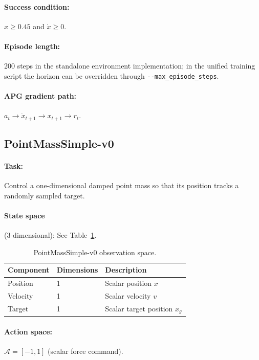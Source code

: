 \documentclass[11pt,a4paper]{article}
\newcommand{\cA}{\mathcal{A}}
\begin{document}
\paragraph{Success condition:} $x \ge 0.45$ and $\dot{x} \ge 0$.

\paragraph{Episode length:} 200 steps in the standalone environment implementation; in the unified training script the horizon can be overridden through \texttt{-{}-max\_episode\_steps}.

\paragraph{APG gradient path:} $a_t \rightarrow \dot{x}_{t+1} \rightarrow x_{t+1} \rightarrow r_t$.

\subsection{PointMassSimple-v0}
\label{sec:env_pointmass_simple}

\paragraph{Task:} Control a one-dimensional damped point mass so that its position tracks a randomly sampled target.

\paragraph{State space} (3-dimensional): See Table~\ref{tab:pms_obs}.

\begin{table}[htbp]
  \centering
  \caption{PointMassSimple-v0 observation space.}
  \label{tab:pms_obs}
  \begin{tabular}{@{}lll@{}}
    \toprule
    \textbf{Component} & \textbf{Dimensions} & \textbf{Description} \\
    \midrule
    Position & 1 & Scalar position $x$ \\
    Velocity & 1 & Scalar velocity $v$ \\
    Target   & 1 & Scalar target position $x_g$ \\
    \bottomrule
  \end{tabular}
\end{table}

\paragraph{Action space:} $\cA = [-1, 1]$ (scalar force command).
\end{document}
